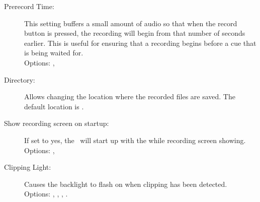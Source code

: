 \begin{description}
  \item[Prerecord Time:]
    This setting buffers a small amount of audio so that when the record button
    is pressed, the recording will begin from that number of seconds earlier.
    This is useful for ensuring that a recording begins before a cue that is
    being waited for.\\
    Options: , 
    
  \item[Directory:]
    Allows changing the location where the recorded files are saved. The
    default location is .
    
  \item[Show recording screen on startup:]
    If set to yes, the \dap\ will start up with the while recording screen
    showing.\\
    Options: , 
    
  \item[Clipping Light:]
    Causes the backlight to flash on when clipping has been detected.\\
    Options: , ,
      , .
    

  \end{description}
